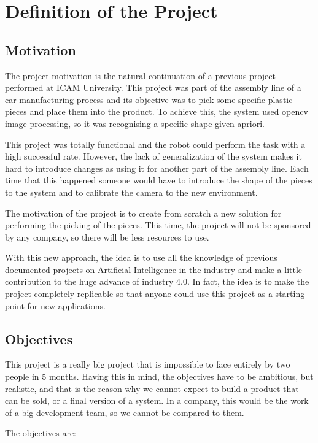 \chapter{Definition of the Project}

	\section{Motivation}
		The project motivation is the natural continuation of a previous project performed at ICAM University. This project was part of the assembly line of a car manufacturing process and its objective was to pick some specific plastic pieces and place them into the product. To achieve this, the system used opencv image processing, so it was recognising a specific shape given apriori.
		
		This project was totally functional and the robot could perform the task with a high successful rate. However, the lack of generalization of the system makes it hard to introduce changes as using it for another part of the assembly line. Each time that this happened someone would have to introduce the shape of the pieces to the system and to calibrate the camera to the new environment. 
		
		The motivation of the project is to create from scratch a new solution for performing the picking of the pieces. This time, the project will not be sponsored by any company, so there will be less resources to use.
		
		With this new approach, the idea is to use all the knowledge of previous documented projects on Artificial Intelligence in the industry and make a little contribution to the huge advance of industry 4.0. In fact, the idea is to make the project completely replicable so that anyone could use this project as a starting point for new applications.

	\section{Objectives}

		This project is a really big project that is impossible to face entirely by two people in 5 months. Having this in mind, the objectives have to be ambitious, but realistic, and that is the reason why we cannot expect to build a product that can be sold, or a final version of a system. In a company, this would be the work of a big development team, so we cannot be compared to them.
		
		The objectives are:
		
